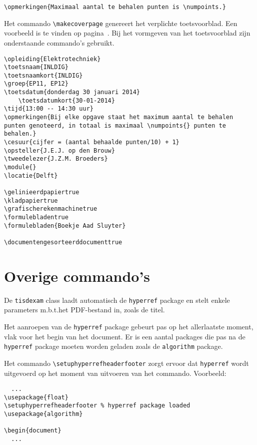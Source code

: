 \documentclass[dutch,a4paper,12pt,addpoints,fleqn,oneside]{tisdexam}
\newcommand\Package[1]{\texttt{#1}}
\newcommand\DocClass[1]{\texttt{#1}}
\begin{document}
\bigskip
\verb|\opmerkingen{Maximaal aantal te behalen punten is \numpoints.}|


\bigskip
Het commando \verb|\makecoverpage| genereert het verplichte toetsvoorblad.
Een voorbeeld is te vinden op pagina~\pageref{pag:coverpage}. Bij het vormgeven
van het toetsvoorblad zijn onderstaande commando's gebruikt.

\begin{lstlisting}
\opleiding{Elektrotechniek}
\toetsnaam{INLDIG}
\toetsnaamkort{INLDIG}
\groep{EP11, EP12}
\toetsdatum{donderdag 30 januari 2014}
	\toetsdatumkort{30-01-2014}
\tijd{13:00 -- 14:30 uur}
\opmerkingen{Bij elke opgave staat het maximum aantal te behalen punten genoteerd, in totaal is maximaal \numpoints{} punten te behalen.}
\cesuur{cijfer = (aantal behaalde punten/10) + 1}
\opsteller{J.E.J. op den Brouw}
\tweedelezer{J.Z.M. Broeders}
\module{}
\locatie{Delft}

\gelinieerdpapiertrue
\kladpapiertrue
\grafischerekenmachinetrue
\formulebladentrue
\formulebladen{Boekje Aad Sluyter}

\documentengesorteerddocumenttrue
\end{lstlisting}

\section{Overige commando's}
\label{sec:overigecom}

De \DocClass{tisdexam} class laadt automatisch de \Package{hyperref} package
en stelt enkele parameters m.b.t.\@ het PDF-bestand in, zoals de titel.

Het aanroepen van de \Package{hyperref} package gebeurt pas op het allerlaatste
moment, vlak voor het begin van het document. Er is een aantal packages die
pas na de \Package{hyperref} package moeten worden geladen zoals de \Package{algorithm}
package.

Het commando \verb|\setuphyperrefheaderfooter| zorgt ervoor dat \Package{hyperref}
wordt uitgevoerd op het moment van uitvoeren van het commando. Voorbeeld:

\begin{lstlisting}
  ...
\usepackage{float}
\setuphyperrefheaderfooter % hyperref package loaded
\usepackage{algorithm}

\begin{document}
  ...
\end{lstlisting}
\end{document}
